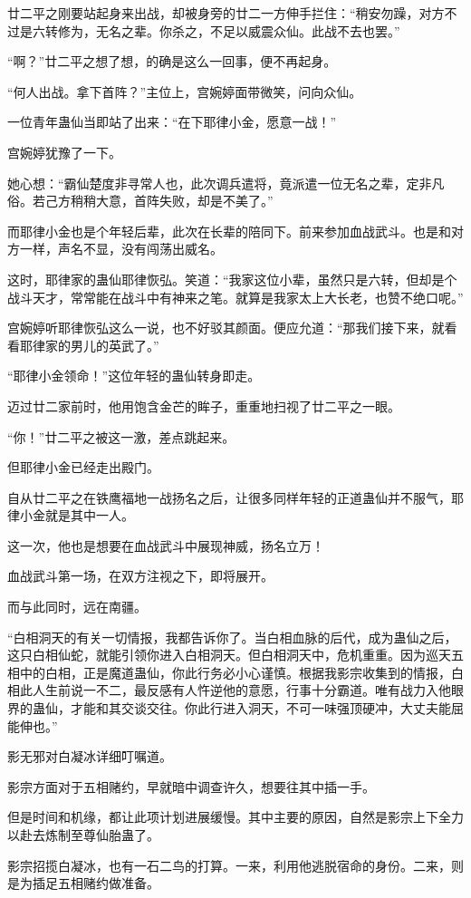 \begin{this_body}
廿二平之刚要站起身来出战，却被身旁的廿二一方伸手拦住：“稍安勿躁，对方不过是六转修为，无名之辈。你杀之，不足以威震众仙。此战不去也罢。”

“啊？”廿二平之想了想，的确是这么一回事，便不再起身。

“何人出战。拿下首阵？”主位上，宫婉婷面带微笑，问向众仙。

一位青年蛊仙当即站了出来：“在下耶律小金，愿意一战！”

宫婉婷犹豫了一下。

她心想：“霸仙楚度非寻常人也，此次调兵遣将，竟派遣一位无名之辈，定非凡俗。若己方稍稍大意，首阵失败，却是不美了。”

而耶律小金也是个年轻后辈，此次在长辈的陪同下。前来参加血战武斗。也是和对方一样，声名不显，没有闯荡出威名。

这时，耶律家的蛊仙耶律恢弘。笑道：“我家这位小辈，虽然只是六转，但却是个战斗天才，常常能在战斗中有神来之笔。就算是我家太上大长老，也赞不绝口呢。”

宫婉婷听耶律恢弘这么一说，也不好驳其颜面。便应允道：“那我们接下来，就看看耶律家的男儿的英武了。”

“耶律小金领命！”这位年轻的蛊仙转身即走。

迈过廿二家前时，他用饱含金芒的眸子，重重地扫视了廿二平之一眼。

“你！”廿二平之被这一激，差点跳起来。

但耶律小金已经走出殿门。

自从廿二平之在铁鹰福地一战扬名之后，让很多同样年轻的正道蛊仙并不服气，耶律小金就是其中一人。

这一次，他也是想要在血战武斗中展现神威，扬名立万！

血战武斗第一场，在双方注视之下，即将展开。

而与此同时，远在南疆。

“白相洞天的有关一切情报，我都告诉你了。当白相血脉的后代，成为蛊仙之后，这只白相仙蛇，就能引领你进入白相洞天。但白相洞天中，危机重重。因为巡天五相中的白相，正是魔道蛊仙，你此行务必小心谨慎。根据我影宗收集到的情报，白相此人生前说一不二，最反感有人忤逆他的意愿，行事十分霸道。唯有战力入他眼界的蛊仙，才能和其交谈交往。你此行进入洞天，不可一味强顶硬冲，大丈夫能屈能伸也。”

影无邪对白凝冰详细叮嘱道。

影宗方面对于五相赌约，早就暗中调查许久，想要往其中插一手。

但是时间和机缘，都让此项计划进展缓慢。其中主要的原因，自然是影宗上下全力以赴去炼制至尊仙胎蛊了。

影宗招揽白凝冰，也有一石二鸟的打算。一来，利用他逃脱宿命的身份。二来，则是为插足五相赌约做准备。


\end{this_body}
